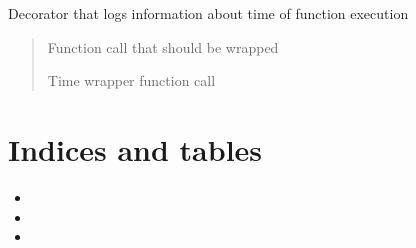 \documentclass[letterpaper,10pt,english]{sphinxmanual}
\begin{document}
\begin{fulllineitems}
\label{\detokenize{pcm_utilities:pcm_utilities.time_decorator}}
\pysigstartsignatures
{}
\pysigstopsignatures
\sphinxAtStartPar
Decorator that logs information about time of function execution
\begin{quote}\begin{description}
\sphinxAtStartPar
{} \textendash{} Function call that should be wrapped

\sphinxAtStartPar
{}

\sphinxAtStartPar
Time wrapper function call

\end{description}\end{quote}

\end{fulllineitems}



\chapter{Indices and tables}
\label{\detokenize{index:indices-and-tables}}\begin{itemize}
\item {} 
\sphinxAtStartPar
{}

\item {} 
\sphinxAtStartPar
{}

\item {} 
\sphinxAtStartPar
{}

\end{itemize}


\renewcommand{\indexname}{Python Module Index}
\begin{sphinxtheindex}
\let\bigletter\sphinxstyleindexlettergroup
\bigletter{p}
\item\relax{}
\item\relax{}
\item\relax{}
\end{sphinxtheindex}

\renewcommand{\indexname}{Index}
\printindex
\end{document}
